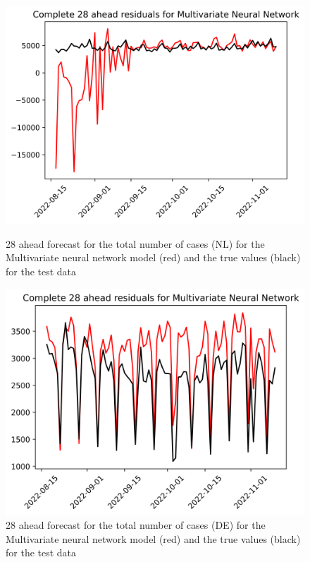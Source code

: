 \begin{figure}

\begin{minipage}{.45\textwidth}
  \centering
  \includegraphics[width=\linewidth]{pics/28_ah/Complete_28_ahead_Multivariate Neural Network.png}
  \caption{28 ahead forecast for the total number of cases (NL) for the Multivariate neural network model (red) and the true values (black) for the test data}
  \label{fig:tot_cases_fc_28_mvnn}
\end{minipage}
\begin{minipage}{.45\textwidth}
  \centering
  \includegraphics[width=\linewidth]{pics/28_ah/DE_Complete_28_ahead_Multivariate Neural Network.png}
  \caption{28 ahead forecast for the total number of cases (DE) for the Multivariate neural network model (red) and the true values (black) for the test data}
  \label{fig:tot_cases_fc_28_mvnn_DE}
\end{minipage}

\end{figure}
